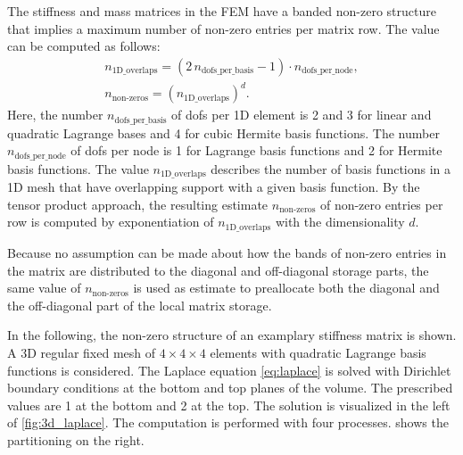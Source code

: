 The stiffness and mass matrices in the FEM have a banded non-zero structure that implies a maximum number of non-zero entries per matrix row. The value can be computed as follows:
\begin{equation}\label{eq:nonzero_estimates}
  \begin{array}{ll}
    n_\text{1D\_overlaps} = (2\,n_\text{dofs\_per\_basis} - 1)\cdot n_\text{dofs\_per\_node},\\[4mm]
    n_\text{non-zeros} = \left(n_\text{1D\_overlaps}\right)^d.
  \end{array}
\end{equation}
Here, the number $n_\text{dofs\_per\_basis}$ of dofs per 1D element is 2 and 3 for linear and quadratic Lagrange bases and 4 for cubic Hermite basis functions. The number $n_\text{dofs\_per\_node}$ of dofs per node is 1 for Lagrange basis functions and 2 for Hermite basis functions. The value $n_\text{1D\_overlaps}$ describes the number of basis functions in a 1D mesh that have overlapping support with a given basis function. By the tensor product approach, the resulting estimate $n_\text{non-zeros}$ of non-zero entries per row is computed by exponentiation of $n_\text{1D\_overlaps}$ with the dimensionality $d$.

Because no assumption can be made about how the bands of non-zero entries in the matrix are distributed to the diagonal and off-diagonal storage parts, the same value of $n_\text{non-zeros}$ is used as estimate to preallocate both the diagonal and the off-diagonal part of the local matrix storage.

In the following, the non-zero structure of an examplary stiffness matrix is shown. A 3D regular fixed mesh of $4\times 4 \times 4$ elements with quadratic Lagrange basis functions is considered. The Laplace equation \cref{eq:laplace} is solved with Dirichlet boundary conditions at the bottom and top planes of the volume. The prescribed values are 1 at the bottom and 2 at the top. The solution is visualized in the left of \cref{fig:3d_laplace}. The computation is performed with four processes.  shows the partitioning on the right.

